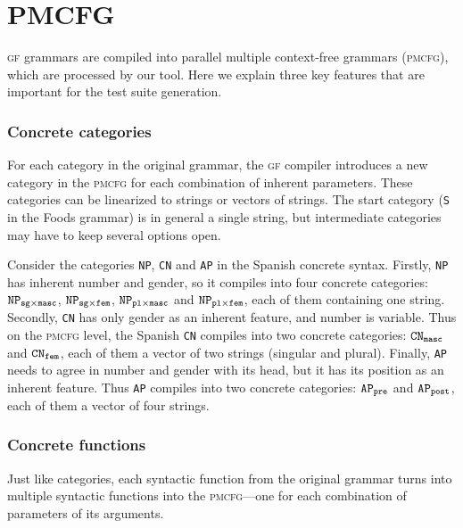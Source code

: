 \documentclass[runningheads]{llncs}
\def\t#1{\texttt{#1}}
\def\gf{\textsc{gf}}
\def\pmcfg{\textsc{pmcfg}}
\newcommand{\quality}[1]{${\tt AP_{#1}}$}
\newcommand{\kind}[1]{${\tt CN_{#1}}$}
\newcommand{\itemSpa}[2]{${\tt NP_{#1\times#2}}$}
\newcommand{\itemEng}[1]{${\tt NP_{#1}}$}
\begin{document}
\section{PMCFG}
\label{sec:PMCFG}

\gf{} grammars are compiled into parallel multiple context-free
grammars (\pmcfg), which are processed by our tool. Here we explain
three key features that are important for the test suite generation.

\subsubsection{Concrete categories}

For each category in the original grammar, the \gf{} compiler
introduces a new category in the \pmcfg{} for each combination of
inherent parameters.  
These categories can be linearized to strings or vectors of
strings. The start category (\t{S} in the Foods grammar) is in
general a single string, but intermediate categories may have to keep
several options open. 

Consider the categories \t{NP}, \t{CN} and \t{AP} in the
Spanish concrete syntax. Firstly, \t{NP} has inherent number
and gender, so it compiles into four concrete categories:
\itemSpa{sg}{masc}, \itemSpa{sg}{fem}, \itemSpa{pl}{masc} and
\itemSpa{pl}{fem}, each of them containing one string. Secondly,
\t{CN} has only gender as an inherent feature, and number is
variable. Thus on the \pmcfg{} level, the Spanish \t{CN} compiles
into two concrete categories: \kind{masc} and \kind{fem}, each of them
a vector of two strings (singular and plural). Finally, \t{AP}
needs to agree in number and gender with its head, but it has its
position as an inherent feature.  Thus \t{AP} compiles into two
concrete categories: \quality{pre} and \quality{post}, each of them a
vector of four strings. 

\subsubsection{Concrete functions}
Just like categories, each syntactic function from the original
grammar turns into multiple syntactic functions into the
\pmcfg{}---one for each combination of parameters of its arguments.
\end{document}
